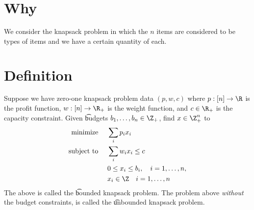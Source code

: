 
\section*{Why}

We consider the knapsack problem in which the $n$ items are considered to be types of items and we have a certain quantity of each.

\section*{Definition}

Suppose we have zero-one knapsack problem data $(p, w, c)$ where $p: [n] \to \R $ is the profit function, $w: [n] \to \R _+$ is the weight function, and $c \in \R _+$ is the capacity constraint.
Given \t{budgets} $b_1, \dots , b_n \in \Z _+$, find $x \in \Z _+^n$ to
\[
\begin{aligned}
\text{minimize } & \quad \sum_i p_ix_i \\
\text{subject to } & \quad \sum_i w_ix_i \leq c \\
& \quad 0 \leq x_i \leq b_i, \quad i = 1, \dots , n, \\
&\quad x_i \in \Z  \quad i = 1, \dots , n
\end{aligned}
\]
The above is called the \t{bounded knapsack problem}.
The problem above \textit{without} the budget constraints, is called the \t{unbounded knapsack problem}.

\blankpage
